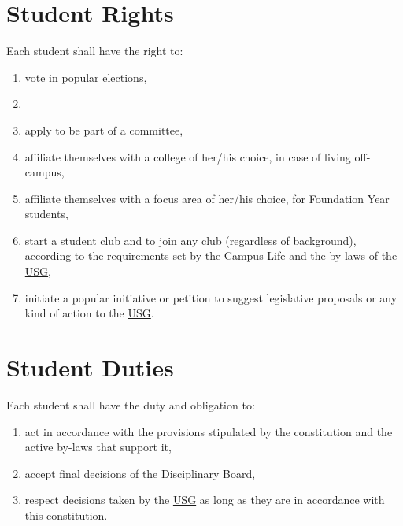 \section{Student Rights}
Each student shall have the right to:
\begin{enumerate}[nosep] 
\item
vote in popular elections,

\item
{}

\item
apply to be part of a committee,

\item
affiliate themselves with a college of her/his choice, in case of living off-campus,

\item 
affiliate themselves with a focus area of her/his choice, for Foundation Year students,

\item
start a student club and to join any club (regardless of background), according to the requirements set by the Campus Life and the by-laws of the \hyperref[USGdef]{USG},

\item
initiate a popular initiative or petition to suggest legislative proposals or any kind of action to the \hyperref[USGdef]{USG}.
\end{enumerate}

\section{Student Duties}
Each student shall have the duty and obligation to:
\begin{enumerate}
\item
act in accordance with the provisions stipulated by the constitution and the active by-laws that support it,

\item 
accept final decisions of the Disciplinary Board,

\item
 respect decisions taken by the \hyperref[USGdef]{USG} as long as they are in accordance with this constitution.
\end{enumerate}